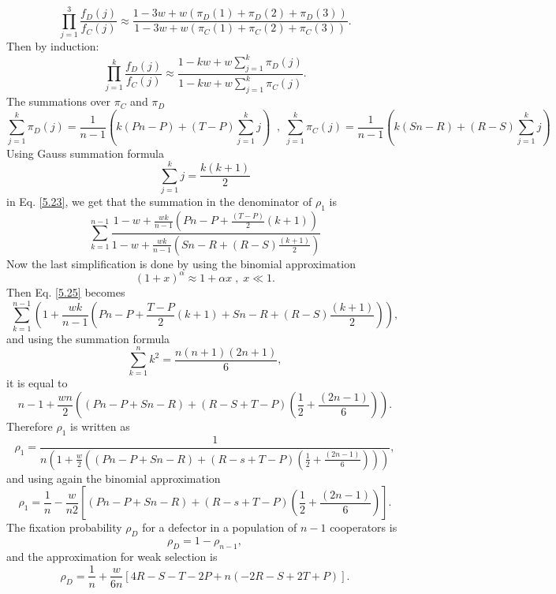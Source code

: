\begin{equation}
\prod\limits_{j=1}^{3}\frac{f_D(j)}{f_C(j)}\approx \frac{1-3w+w(\pi_D(1)+\pi_D(2)+\pi_D(3))}{1-3w+w(\pi_C(1)+\pi_C(2)+\pi_C(3))}.
\end{equation}
Then by induction:
\begin{equation}
\prod\limits_{j=1}^{k}\frac{f_D(j)}{f_C(j)}\approx \frac{1-kw+w\sum\limits_{j=1}^{k}\pi_D(j)}{1-kw+w\sum\limits_{j=1}^{k}\pi_C(j)}.
\end{equation}
The summations over $\pi_C$ and $\pi_D$
\begin{equation}\label{5.23}
\sum\limits_{j=1}^{k}\pi_D(j)=\frac{1}{n-1}(k(Pn-P)+(T-P)\sum\limits_{j=1}^{k}j)\;\; , \;\sum\limits_{j=1}^{k}\pi_C(j)=\frac{1}{n-1}(k(Sn-R)+(R-S)\sum\limits_{j=1}^{k}j)
\end{equation}
Using  Gauss summation formula
\begin{equation}\label{}
\sum\limits_{j=1}^{k}j=\frac{k(k+1)}{2}
\end{equation}
in Eq. \eqref{5.23}, we get that the summation in the denominator of $\rho_1$ is
\begin{equation}\label{5.25}
\sum\limits_{k=1}^{n-1}\frac{1-w+\frac{wk}{n-1}(Pn-P+\frac{(T-P)}{2}(k+1))}{1-w+\frac{wk}{n-1}(Sn-R+(R-S)\frac{(k+1)}{2})}
\end{equation}
Now the last simplification is done by using the binomial approximation
\begin{equation}
(1+x)^{\alpha}\approx 1+\alpha x\;,\; x\ll1.
\end{equation} 
Then Eq. \eqref{5.25} becomes
\begin{equation}
\sum\limits_{k=1}^{n-1}\left(1+\frac{wk}{n-1}(Pn-P+ \frac{T-P}{2}(k+1)+Sn-R+(R-S)\frac{(k+1)}{2}) \right),
\end{equation}
and using the summation formula
\begin{equation}
\sum\limits_{k=1}^{n}k^2 =\frac{n(n+1)(2n+1)}{6},
\end{equation} 
it is equal to
\begin{equation}
n-1+\frac{wn}{2}\left( (Pn-P+Sn-R)+(R-S+T-P)\left(\frac{1}{2}+\frac{(2n-1)}{6}\right)\right).
\end{equation}
Therefore $\rho_1$ is written as
\begin{equation}
\rho_1 =\frac{1}{n\left(1+ \frac{w}{2}\left( (Pn-P+Sn-R)+(R-s+T-P)(\frac{1}{2}+\frac{(2n-1)}{6})\right)\right)},
\end{equation}
and using again the binomial approximation
\begin{equation}\label{5.29}
\rho_1=\frac{1}{n}-\frac{w}{n2}\left[ (Pn-P+Sn-R)+(R-s+T-P)(\frac{1}{2}+\frac{(2n-1)}{6})\right].
\end{equation}
The fixation probability $\rho_D$ for a defector in a population of $n-1$ cooperators is
\begin{equation}
\rho_D=1-\rho_{n-1},
\end{equation}
and the approximation for weak selection is
\begin{equation}\label{5.31}
\rho_D=\frac{1}{n}+\frac{w}{6n}\left[ 4R-S-T-2P+n(-2R-S+2T+P)\right].
\end{equation}
